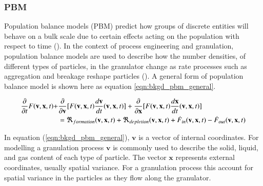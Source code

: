 \documentclass[preprint,11pt,authoryear]{elsarticle}
\begin{document}
\subsubsection{PBM}
\par Population balance models (PBM) predict how groups of discrete entities will behave on a bulk scale due to certain effects acting on the population with respect to time (\cite{ramkrishna2014}). In the context of process engineering and granulation, population balance models are used to describe how the number densities, of different types of particles, in the granulator change as rate processes such as aggregation and breakage reshape particles (\cite{Barrasso2013}). A general form of population balance model is shown here as equation \ref{eqn:bkgd_pbm_general}.

\begin{align}
\frac{ \partial}{\partial t}F(\textbf{v},\textbf{x},t) +& \frac{\partial}{\partial \textbf{v}}[F(\textbf{v},\textbf{x},t)\frac{d\textbf{v}}{dt}(\textbf{v},\textbf{x},t)] + \frac{\partial}{\partial \textbf{x}}[F(\textbf{v},\textbf{x},t)\frac{d\textbf{x}}{dt}(\textbf{v},\textbf{x},t)] \notag\\
&= \Re_{formation}(\textbf{v},\textbf{x},t)+\Re_{depletion}(\textbf{v},\textbf{x},t)+\dot{F}_{in}(\textbf{v},\textbf{x},t)-\dot{F}_{out}(\textbf{v},\textbf{x},t)
\label{eqn:bkgd_pbm_general} 
\end{align}

\par In equation (\ref{eqn:bkgd_pbm_general}), $\textbf{v}$ is a vector of internal coordinates. For modelling a granulation process $\textbf{v}$ is commonly used to describe the solid, liquid, and gas content of each type of particle. The vector $\textbf{x}$ represents external coordinates, usually spatial variance. For a granulation process this  account for spatial variance in the particles as they flow along the granulator.
\end{document}
